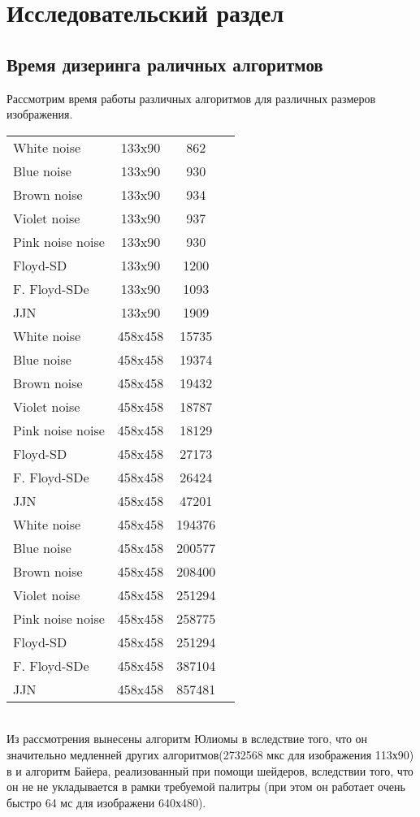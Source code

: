 \chapter{Исследовательский раздел}
\label{cha:research}
\section{Время дизеринга раличных алгоритмов}

Рассмотрим время работы различных алгоритмов для различных размеров изображения.

\begin{tabular}{|@{\hspace*{2mm}}l||*{3}{c|}}\hline

	&\makebox[12em]{Размер, пиксели}&\makebox[6em]{Время, мкс}
	\\\hline\hline
	White noise&133x90&862\\\hline
	Blue noise&133x90&930\\\hline
	Brown noise&133x90&934\\\hline
	Violet noise &133x90&937\\\hline
	Pink noise noise&133x90&930\\\hline
	Floyd-SD&133x90&1200\\\hline
	F. Floyd-SDe&133x90&1093\\\hline
	JJN &133x90&1909\\\hline
	White noise&458x458&15735\\\hline
	Blue noise&458x458&19374\\\hline
	Brown noise&458x458&19432\\\hline
	Violet noise &458x458&18787\\\hline
	Pink noise noise&458x458&18129\\\hline
	Floyd-SD&458x458&27173\\\hline
	F. Floyd-SDe&458x458&26424\\\hline
	JJN &458x458&47201\\\hline
	White noise&458x458&194376\\\hline
	Blue noise&458x458&200577\\\hline
	Brown noise&458x458&208400\\\hline
	Violet noise &458x458&251294\\\hline
	Pink noise noise&458x458&258775\\\hline
	Floyd-SD&458x458&251294\\\hline
	F. Floyd-SDe&458x458&387104\\\hline
	JJN &458x458&857481\\\hline
\end{tabular}
\bigskip
\\
Из рассмотрения вынесены алгоритм Юлиомы в вследствие того, что он значительно медленней других алгоритмов(2732568 мкс для изображения 113х90) в и алгоритм Байера, реализованный при помощи шейдеров, вследствии того, что он не не укладывается в рамки требуемой палитры (при этом он работает очень быстро 64 мс для изображени 640х480).
